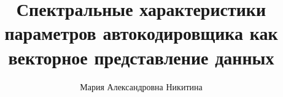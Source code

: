 \documentclass{beamer}
\title[\hbox to 56mm{Спектральные характеристики параметров автокодировщика}]{Спектральные характеристики параметров автокодировщика как векторное представление данных}
\author[М.\,А. Никитина]{Мария Александровна Никитина}
\institute{Московский физико-технический институт}
\date{\footnotesize
\par\smallskip\emph{Кафедра:} Интеллектуальный анализ данных
\par\smallskip\emph{Консультант:} аспирант А.\,Ю.~Бишук
\par\smallskip\emph{Научный руководитель:} кандидат ф.-м. наук О.\,Ю.~Бахтеев
\par\bigskip\small 2026}
\begin{document}
\begin{frame}
\thispagestyle{empty}
\maketitle
\end{frame}



\end{document}
